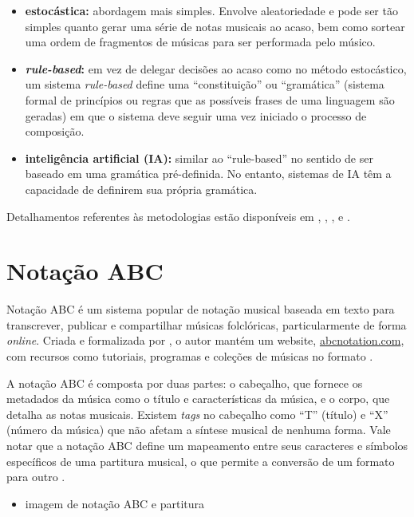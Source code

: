 \documentclass{automatextcc}
\begin{document}
\begin{itemize}
    \item \textbf{estocástica:} abordagem mais simples. Envolve aleatoriedade e pode ser tão simples quanto gerar uma série de notas musicais ao acaso, bem como sortear uma ordem de fragmentos de músicas para ser performada pelo músico.
    \item \textbf{\textit{rule-based}:} em vez de delegar decisões ao acaso como no método estocástico, um sistema \textit{rule-based} define uma ``constituição'' ou ``gramática'' (sistema formal de princípios ou regras que as possíveis frases de uma linguagem são geradas) em que o sistema deve seguir uma vez iniciado o processo de composição. 
    \item \textbf{inteligência artificial (IA):} similar ao ``rule-based'' no sentido de ser baseado em uma gramática pré-definida. No entanto, sistemas de IA têm a capacidade de definirem sua própria gramática.
\end{itemize}
Detalhamentos referentes às metodologias estão disponíveis em \citet{alpern1995}, \citet{maurer}, \citet{nierhaus2009}, \citet{fernandez2013} e \citet{hernandez2021}.  


\section{Notação ABC}
Notação ABC é um sistema popular de notação musical baseada em texto para transcrever, publicar e compartilhar músicas folclóricas, particularmente de forma \textit{online}. Criada e formalizada por \citet{walshaw1993}, o autor mantém um website, \url{abcnotation.com}, com recursos como tutoriais, programas e coleções de músicas no formato \citep{walshaw2014}.

A notação ABC é composta por duas partes: o cabeçalho, que fornece os metadados da música como o título e características da música, e o corpo, que detalha as notas musicais. Existem \textit{tags} no cabeçalho como ``T'' (título) e ``X'' (número da música) que não afetam a síntese musical de nenhuma forma. Vale notar que a notação ABC define um mapeamento entre seus caracteres e símbolos específicos de uma partitura musical, o que permite a conversão de um formato para outro \citep{agarwala2017}. 

\begin{itemize}
    \item imagem de notação ABC e partitura
\end{itemize}
\end{document}
